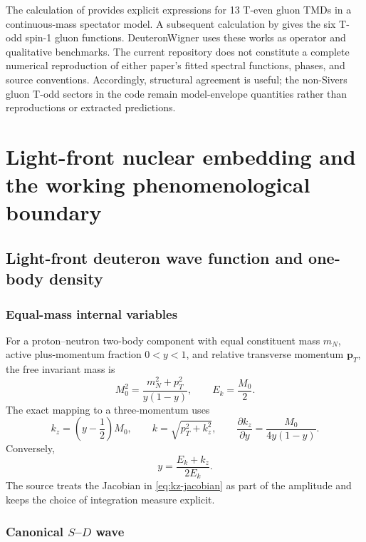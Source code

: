 \documentclass[11pt,oneside]{book}
\newcommand{\pT}{\bm{p}_{T}}
\begin{document}
The calculation of \textcite{XieChenLu2026} provides explicit expressions for 13 T-even gluon TMDs in a continuous-mass spectator model.  A subsequent calculation by \textcite{XieLu2026TOdd} gives the six T-odd spin-1 gluon functions.  DeuteronWigner uses these works as operator and qualitative benchmarks.  The current repository does not constitute a complete numerical reproduction of either paper's fitted spectral functions, phases, and source conventions.  Accordingly, structural agreement is useful; the non-Sivers gluon T-odd sectors in the code remain model-envelope quantities rather than reproductions or extracted predictions.

\part{Light-front nuclear embedding and the working phenomenological boundary}

\chapter{Light-front deuteron wave function and one-body density}
\label{chap:lfdeuteron}

\section{Equal-mass internal variables}

For a proton--neutron two-body component with equal constituent mass $m_N$, active plus-momentum fraction $0<y<1$, and relative transverse momentum $\pT$, the free invariant mass is
\begin{equation}
 M_0^2=\frac{m_N^2+p_T^2}{y(1-y)},
 \qquad E_k=\frac{M_0}{2}.
 \label{eq:M0}
\end{equation}
The exact mapping to a three-momentum uses
\begin{equation}
 k_z=\left(y-\frac12\right)M_0,
 \qquad
 k=\sqrt{p_T^2+k_z^2},
 \qquad
 \frac{\partial k_z}{\partial y}=\frac{M_0}{4y(1-y)}.
 \label{eq:kz-jacobian}
\end{equation}
Conversely,
\begin{equation}
 y=\frac{E_k+k_z}{2E_k}.
\end{equation}
The source treats the Jacobian in \cref{eq:kz-jacobian} as part of the amplitude and keeps the choice of integration measure explicit.

\section{Canonical \texorpdfstring{$S$--$D$}{S--D} wave}
\end{document}
